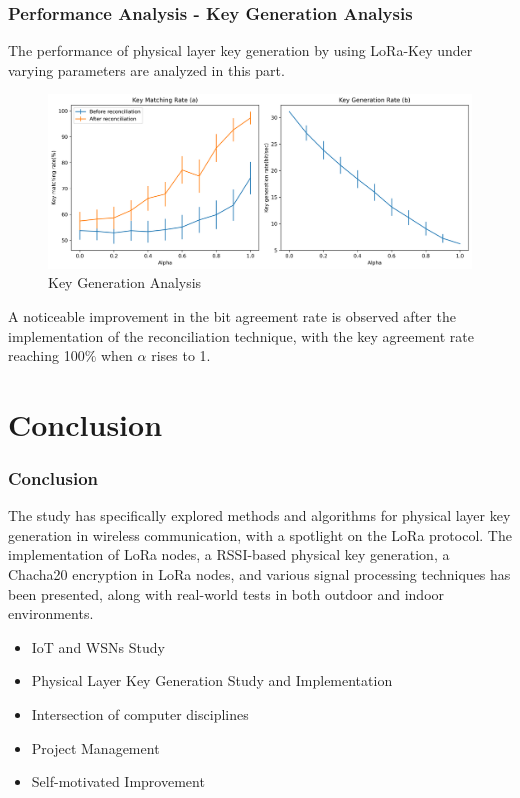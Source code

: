 \documentclass{beamer}
\begin{document}
\begin{frame}
  \frametitle{Performance Analysis -  Key Generation Analysis}

  The performance of physical layer key generation by using LoRa-Key under varying parameters are analyzed in this part.
  \begin{figure}
    \centering
    \includegraphics[width=0.8\linewidth]{../figures/keygenanalyst.png}
    \caption{Key Generation Analysis}
    \label{keygenanalyst}
  \end{figure}
A noticeable improvement in the bit agreement rate is observed after the implementation of the reconciliation technique, with the key agreement rate reaching 100$\%$ when \(\alpha\) rises to 1. 

\end{frame}

\section{Conclusion}

\begin{frame}
  \frametitle{Conclusion}
  The study has specifically explored methods and algorithms for physical layer key generation in wireless communication, with a spotlight on the LoRa protocol. The implementation of LoRa nodes, a RSSI-based physical key generation, a Chacha20 encryption in LoRa nodes, and various signal processing techniques has been presented, along with real-world tests in both outdoor and indoor environments.
\vspace{0.2in}
  \begin{itemize}
    \item IoT and WSNs Study
    \item Physical Layer Key Generation Study and Implementation
    \item Intersection of computer disciplines
    \item Project Management \footnotemark
    \item Self-motivated Improvement
    \end{itemize}
\end{frame}
\end{document}
